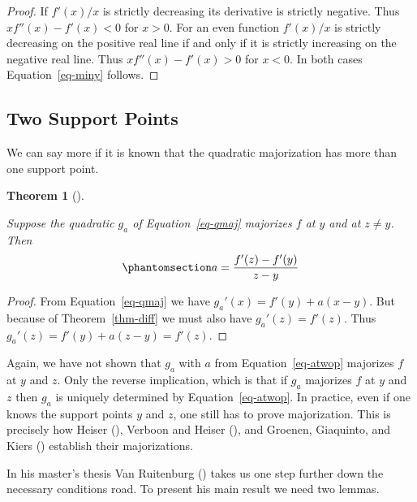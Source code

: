 \documentclass[
  12pt,
  letterpaper,
  DIV=11,
  numbers=noendperiod]{scrartcl}
\theoremstyle{definition}
\theoremstyle{plain}
\theoremstyle{plain}
\newtheorem{theorem}{Theorem}[section]
\theoremstyle{plain}
\theoremstyle{definition}
\theoremstyle{remark}
\begin{document}
\begin{proof}
If \(f'(x)/x\) is strictly decreasing its derivative is strictly
negative. Thus \(xf''(x)-f'(x)<0\) for \(x>0\). For an even function
\(f'(x)/x\) is strictly decreasing on the positive real line if and only
if it is strictly increasing on the negative real line. Thus
\(xf''(x)-f'(x)>0\) for \(x<0\). In both cases Equation~\ref{eq-miny}
follows.
\end{proof}

\subsection{Two Support Points}\label{sec-twosupport}

We can say more if it is known that the quadratic majorization has more
than one support point.

\begin{theorem}[]\protect\hypertarget{thm-twop}{}\label{thm-twop}

Suppose the quadratic \(g_a\) of Equation~\ref{eq-qmaj} majorizes \(f\)
at \(y\) and at \(z\not= y\). Then
\begin{equation}\phantomsection\label{eq-atwop}{
a=\frac{f'(z)-f'(y)}{z-y}
}\end{equation}

\end{theorem}

\begin{proof}
From Equation~\ref{eq-qmaj} we have \(g_a'(x)=f'(y)+a(x-y)\). But
because of Theorem~\ref{thm-diff} we must also have \(g_a'(z)=f'(z)\).
Thus \(g_a'(z)=f'(y)+a(z-y)=f'(z)\).
\end{proof}

Again, we have not shown that \(g_a\) with \(a\) from
Equation~\ref{eq-atwop} majorizes \(f\) at \(y\) and \(z\). Only the
reverse implication, which is that if \(g_a\) majorizes \(f\) at \(y\)
and \(z\) then \(g_a\) is uniquely determined by
Equation~\ref{eq-atwop}. In practice, even if one knows the support
points \(y\) and \(z\), one still has to prove majorization. This is
precisely how Heiser (), Verboon and
Heiser (), and Groenen, Giaquinto,
and Kiers () establish
their majorizations.

In his master's thesis Van Ruitenburg
() takes us one step further down
the necessary conditions road. To present his main result we need two
lemmas.
\end{document}
